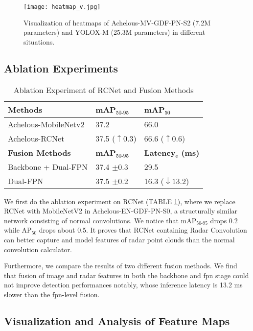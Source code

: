 \documentclass[letterpaper, 10 pt, conference]{ieeeconf}
\begin{document}
\begin{figure*}
    \centering
    \texttt{[image: heatmap\_v.jpg]}
    \caption{Visualization of heatmaps of Achelous-MV-GDF-PN-S2 (7.2M parameters) and YOLOX-M (25.3M parameters) in different situations.}
    \label{fig:heatmap_visual}
\end{figure*}

\subsection{Ablation Experiments}

\begin{table}
\caption{Ablation Experiment of RCNet and Fusion Methods}
\centering
\label{tab:rc_net_compare}
\begin{tabular}{l|ll}  
\toprule   
  \textbf{Methods} & \textbf{mAP}$_{\text{50-95}}$ & \textbf{mAP}$_{\text{50}}$  \\
\midrule 
  Achelous-MobileNetv2 & 37.2  & 66.0  \\
  Achelous-RCNet & 37.5 ($\uparrow 0.3$) & 66.6 ($\uparrow 0.6$)   \\
\midrule
  \textbf{Fusion Methods} & \textbf{mAP}$_{\text{50-95}}$ & \textbf{Latency$_{\text{e}}$ (ms)} \\
\midrule
  Backbone + Dual-FPN & 37.4 $\pm 0.3$ & 29.5 \\
  Dual-FPN & 37.5 $\pm 0.2$ & 16.3 ($\downarrow 13.2$) \\
\bottomrule  
\end{tabular}
\end{table}

We first do the ablation experiment on RCNet (TABLE \ref{tab:rc_net_compare}), where we replace RCNet with MobileNetV2 in Achelous-EN-GDF-PN-S0, a structurally similar network consisting of normal convolutions. We notice that mAP$_{\text{50-95}}$ drops $0.2$ while AP$_{\text{50}}$ drops about 0.5. It proves that RCNet containing Radar Convolution can better capture and model features of radar point clouds than the normal convolution calculator.

Furthermore, we compare the results of two different fusion methods. We find that fusion of image and radar features in both the backbone and fpn stage could not improve detection performances notably, whose inference latency is 13.2 ms slower than the fpn-level fusion.



\subsection{Visualization and Analysis of Feature Maps}
\end{document}
